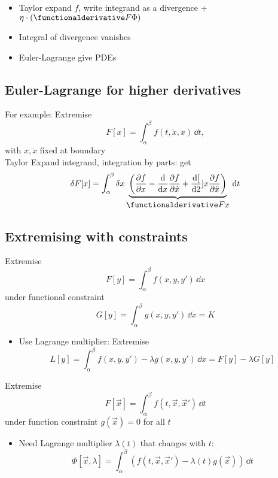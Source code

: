 \begin{itemize}
    \item Taylor expand $f$, write integrand as a divergence + $\eta \cdot (\fdv{F}{\Phi})$
    \item Integral of divergence vanishes
    \item Euler-Lagrange give PDEs
\end{itemize}

\subsection*{Euler-Lagrange for higher derivatives}
For example: Extremise \[F[x] = \int_\alpha^\beta f(t,\dot{x}, \ddot{x}) \, \dd t, \] with $x, \dot{x}$ fixed at boundary \\

Taylor Expand integrand, integration by parts: get \[ \delta F[x] = \int_\alpha^\beta \delta x \underbrace{\left( \pdv{f}{x} - \odv{}{x} \pdv{f}{\dot{x}} + \odv[2]{}{x}  \pdv{f}{\ddot{x}}  \right)}_{\begin{displaystyle}
            \fdv{F}{x}
        \end{displaystyle}} \, \dd t\]

\subsection*{Extremising with constraints}
Extremise \[F[y] = \int_\alpha^\beta f(x,y,y') \, \dd x\] under functional constraint \[G[y] = \int_\alpha^\beta g(x,y,y') \, \dd x = K \]

\begin{itemize}
    \item Use Lagrange multiplier: Extremise \[L[y] = \int_\alpha^\beta f(x,y,y') - \lambda g(x,y,y') \, \dd x = F[y]- \lambda G[y] \]
\end{itemize}

Extremise \[F[\vec{x}] = \int_\alpha^\beta f(t,\vec{x},\vec{x}') \, \dd t\] under function constraint $g(\vec{x}) = 0$ for all $t$
\begin{itemize}
    \item Need Lagrange multiplier $\lambda(t)$ that changes with $t$: \[\Phi[\vec{x},\lambda] = \int_\alpha^\beta \left( f(t,\vec{x},\vec{x}') - \lambda(t) g(\vec{x}) \right) \, \dd t\]
\end{itemize}


